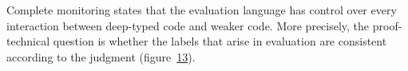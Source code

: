 \documentclass[screen=true, natbib=false, 10pt, sigplan]{acmart}
\newcommand{\FigureRef}[2]{#1}
\begin{document}

Complete monitoring states that the evaluation language has control
over every interaction between deep{-}typed code and weaker code.
More precisely, the proof{-}technical question is whether the labels
that arise in evaluation are consistent according to the \relax{$\sWL$} judgment
(figure~\hyperref[t:x28counter_x28x22figurex22_x22figx3amodelx3aownershipx2dconsistencyx22x29x29]{\FigureRef{13}{t:x28counter_x28x22figurex22_x22figx3amodelx3aownershipx2dconsistencyx22x29x29}}).
\end{document}
